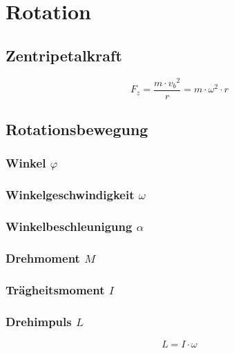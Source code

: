 



\chapter{Rotation}
\section{Zentripetalkraft}
\[ F_z = \frac{m \cdot {v_b}^2}{r} = m \cdot \omega^2 \cdot r \]

\section{Rotationsbewegung}

\subsection{Winkel $\varphi$}


\subsection{Winkelgeschwindigkeit $\omega$}


\subsection{Winkelbeschleunigung $\alpha$}


\subsection{Drehmoment $M$}


\subsection{Trägheitsmoment $I$}


\subsection{Drehimpuls $L$}
\[ \boxed{L=I \cdot \omega} \]